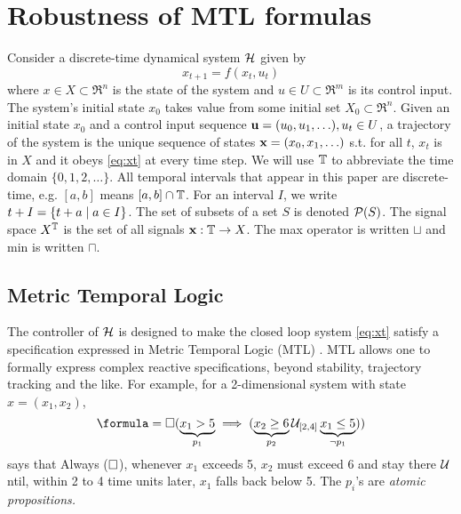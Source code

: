 \section{Robustness of MTL formulas}
\label{sec:robust semantics}

Consider a discrete-time dynamical system $\mathcal{H}$ given by 
\begin{equation}
\label{eq:xt}
x_{t+1} = f(x_t,u_t)
\end{equation}
where $x \in X \subset \Re^n$ is the state of the system and $u \in U \subset \Re^m$ is its control input.
The system's initial state $x_0$ takes value from some initial set $X_0 \subset \Re^n$.
Given an initial state $x_0$ and a control input sequence $\mathbf{u} = (u_0,u_1,\ldots), u_t \in U$, a trajectory of the system is the unique sequence of states $\mathbf{x} = (x_0,x_1,\ldots)$ s.t. for all $t$, $x_t$ is in $X$ and it obeys \eqref{eq:xt} at every time step.
We will use $\mathbb{T}$ to abbreviate the time domain $\{0,1,2,\ldots\}$.
All temporal intervals that appear in this paper are discrete-time, e.g. $[a,b]$ means $[a,b] \cap \mathbb{T}$. 
For an interval $I$, we write $t+I = \{t+a \;|\; a \in I\}$.
The set of subsets of a set $S$ is denoted $\mathcal{P}(S)$.
The signal space $X^{\mathbb{T}}$ is the set of all signals $\mathbf{x}: \mathbb{T} \rightarrow X$.
The max operator is written $\sqcup$ and min is written $\sqcap$.

\subsection{Metric Temporal Logic}
\label{sec:mtl}
The controller of $\mathcal{H}$ is designed to make the closed loop system \eqref{eq:xt} satisfy a specification expressed in Metric Temporal Logic (MTL) \cite{Koymans90}.
MTL allows one to formally express complex reactive specifications, beyond stability, trajectory tracking and the like.
For example, for a 2-dimensional system with state $x=(x_1,x_2)$, 
\begin{equation}
\label{eq:example mtl}
\formula = \always (\underbrace{x_1 > 5}_{p_1} \implies (\underbrace{x_2 \geq 6}_{p_2} \until_{[2,4]} \underbrace{x_1 \leq 5}_{\neg p_1}))
\end{equation}
says that Always ($\square$), whenever $x_1$ exceeds 5, $x_2$ must exceed 6 and stay there $\mathcal{U}$ntil, within 2 to 4 time units later, $x_1$ falls back below 5.
The $p_i$'s are \textit{atomic propositions.}

